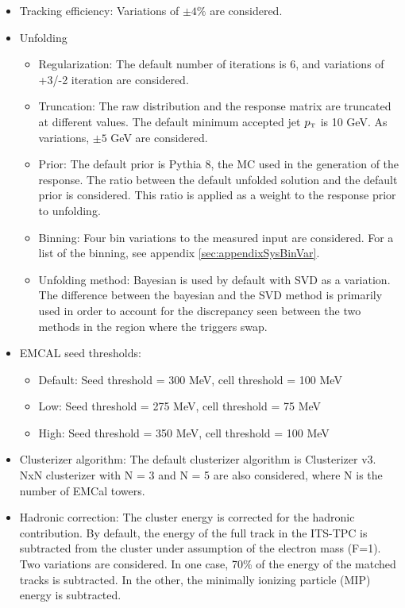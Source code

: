 \documentclass[ALICE]{ALICE_analysis_notes}
\newcommand{\pT}{$p_{\mbox{\tiny T}}$\xspace}
\begin{document}
\begin{itemize}
    \item Tracking efficiency: Variations of $\pm 4\%$ are considered.

    \item Unfolding
    \begin{itemize}
        \item Regularization: The default number of iterations is 6, and variations of +3/-2 iteration are considered.
        \item Truncation: The raw distribution and the response matrix are truncated at different values. The default minimum accepted jet \pT is 10 GeV. As variations, $\pm 5$ GeV are considered.
        \item Prior: The default prior is Pythia 8, the MC used in the generation of the response. The ratio between the default unfolded solution and the default prior is considered. This ratio is applied as a weight to the response prior to unfolding.
        \item Binning: Four bin variations to the measured input are considered. For a list of the binning, see appendix \ref{sec:appendixSysBinVar}.
        \item Unfolding method: Bayesian is used by default with SVD as a variation. The difference between the bayesian and the SVD method is primarily used in order to account for the discrepancy seen between the two methods in the region where the triggers swap.
    \end{itemize}

    \item EMCAL seed thresholds:
    \begin{itemize}
        \item Default: Seed threshold = 300 MeV, cell threshold = 100 MeV
        \item Low: Seed threshold = 275 MeV, cell threshold = 75 MeV
        \item High: Seed threshold = 350 MeV, cell threshold = 100 MeV
    \end{itemize}

    \item Clusterizer algorithm: The default clusterizer algorithm is Clusterizer v3. NxN clusterizer with N = 3 and N = 5 are also considered, where N is the number of EMCal towers.

    \item Hadronic correction: The cluster energy is corrected for the hadronic contribution. By default, the energy of the full track in the ITS-TPC is subtracted from the cluster under assumption of the electron mass (F=1). Two variations are considered. In one case, 70\% of the energy of the matched tracks is subtracted. In the other, the minimally ionizing particle (MIP) energy is subtracted.


\end{itemize}
\end{document}
